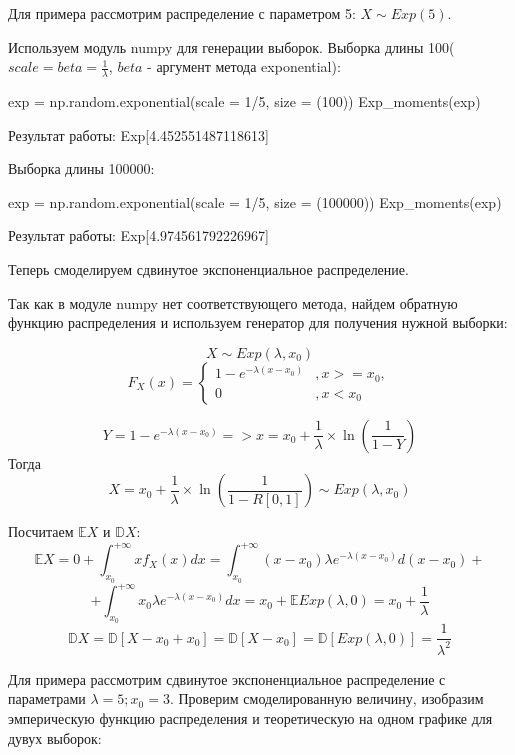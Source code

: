 \documentclass{article}
\begin{document}
Для примера рассмотрим распределение с параметром 5: $X \sim Exp(5)$.

Используем модуль numpy для генерации выборок. Выборка длины 100(
$scale = beta = \frac{1}{\lambda}$, $beta$ - аргумент метода exponential):
\begin{python}
exp = np.random.exponential(scale = 1/5, size = (100))
Exp_moments(exp)
\end{python}
Результат работы:
Exp[4.452551487118613]

Выборка длины 100000:
\begin{python}
exp = np.random.exponential(scale = 1/5, size = (100000))
Exp_moments(exp)
\end{python}
Результат работы:
Exp[4.974561792226967]

Теперь смоделируем сдвинутое экспоненциальное распределение.

Так как в модуле numpy нет соответствующего метода, найдем обратную функцию распределения и используем генератор для получения нужной выборки:

\[X \sim Exp(\lambda, x_0)\]
\begin{equation*}
	F_X(x) = 
	\begin{cases}
		1 - e^{-\lambda(x-x_0)} &, x >= x_0,\\
		0 &, x < x_0
	\end{cases}
\end{equation*}


\[Y = 1 - e^{-\lambda(x-x_0)} => x = x_0 + \frac{1}{\lambda} \times \ln{\left(\frac{1}{1-Y}\right)}\]
Тогда 
\[X = x_0 + \frac{1}{\lambda} \times \ln{\left(\frac{1}{1-R[0, 1]}\right)} \sim Exp(\lambda, x_0)\]

Посчитаем $\mathbb{E}X$ и $\mathbb{D}X$:
\[\mathbb{E}X = 0+\int_{x_0}^{+\infty}xf_X(x)dx = \int_{x_0}^{+\infty}(x-x_0)\lambda e^{-\lambda(x-x_0)}d(x-x_0) +\]
\[+ \int_{x_0}^{+\infty}x_0\lambda e^{-\lambda(x-x_0)}dx = x_0 + \mathbb{E}Exp(\lambda, 0) = x_0 + \frac{1}{\lambda}\]
\[\mathbb{D}X = \mathbb{D}[X- x_0 + x_0] = \mathbb{D}[X-x_0] = \mathbb{D}[Exp(\lambda, 0)] = \frac{1}{\lambda^2}\]

Для примера рассмотрим сдвинутое экспоненциальное распределение с параметрами $\lambda = 5; x_0 = 3$.
Проверим смоделированную величину, изобразим эмперическую функцию распределения и теоретическую на одном графике для дувух выборок:
\end{document}
